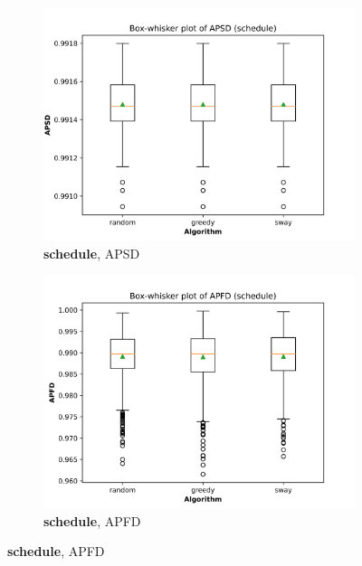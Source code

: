 \documentclass[10pt,journal,compsoc]{IEEEtran}
\begin{document}
	\begin{figure}
		\centering
		
		\begin{subfigure}[b]{0.4\linewidth}
			\centering
			\includegraphics[width=\textwidth]{figures/APSD_schedule.png}
			\caption{{\bf schedule}, APSD}
		\end{subfigure}
		\hfill
		\begin{subfigure}[b]{0.4\linewidth}
			\centering
			\includegraphics[width=\textwidth]{figures/APFD_schedule.png}
			\caption{{\bf schedule}, APFD}
		\end{subfigure}
		
		\vfill
		

\end{figure}
\end{document}
